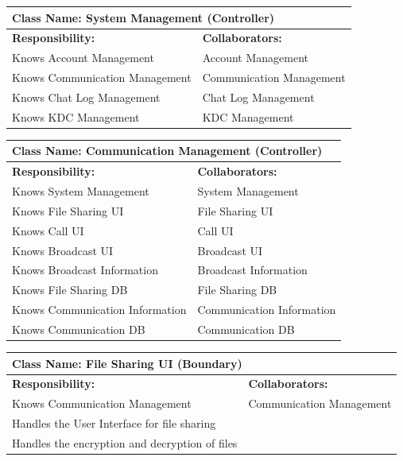 \documentclass[]{article}
\begin{document}
	\begin{table}[ht]
		\centering
		\begin{tabular}{|p{7cm}|p{7cm}|}
		\hline 
			\multicolumn{2}{|l|}{\textbf{Class Name:} System Management (Controller)} \\
		\hline
		\textbf{Responsibility:} & \textbf{Collaborators:} \\
		\hline
		Knows Account Management & Account Management\\
		Knows Communication Management & Communication Management\\
		Knows Chat Log Management & Chat Log Management\\
		Knows KDC Management & KDC Management\\
		\hline
		\end{tabular}
	\end{table}

	\begin{table}[ht]
		\centering
		\begin{tabular}{|p{7cm}|p{7cm}|}
		\hline 
			\multicolumn{2}{|l|}{\textbf{Class Name:} Communication Management (Controller)} \\
		\hline
		\textbf{Responsibility:} & \textbf{Collaborators:} \\
		\hline
		Knows System Management & System Management\\
		Knows File Sharing UI & File Sharing UI\\
		Knows Call UI & Call UI\\
		Knows Broadcast UI & Broadcast UI\\
		Knows Broadcast Information & Broadcast Information\\
		Knows File Sharing DB & File Sharing DB\\
		Knows Communication Information & Communication Information\\
		Knows Communication DB & Communication DB\\
		\hline
		\end{tabular}
	\end{table}

	\begin{table}[ht]
		\centering
		\begin{tabular}{|p{7cm}|p{7cm}|}
		\hline 
			\multicolumn{2}{|l|}{\textbf{Class Name:} File Sharing UI (Boundary)} \\
		\hline
		\textbf{Responsibility:} & \textbf{Collaborators:} \\
		\hline
		Knows Communication Management & Communication Management\\
		Handles the User Interface for file sharing & \\
		Handles the encryption and decryption of files & \\
		\hline
		\end{tabular}
	\end{table}
\end{document}
